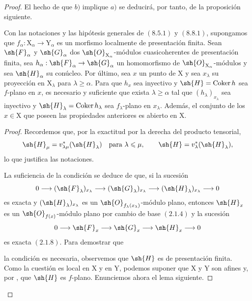 \begin{proof}
El hecho de que $b)$ implique $a)$ se deducirá, por tanto, de la proposición siguiente.

\begin{proposition}[11.3.9]
\label{IV.11.3.9}
Con las notaciones y las hipótesis generales de $(8.5.1)$ y $(8.8.1)$, supongamos que $f_\alpha:\mathrm{X}_\alpha\to\mathrm{Y}_\alpha$ es un morfismo localmente de presentación finita. Sean $\sh{F}_\alpha$ y $\sh{G}_\alpha$ dos $\sh{O}_{\mathrm{X}_\alpha}$-módulos cuasicoherentes de presentación finita, sea $h_\alpha:\sh{F}_\alpha\to\sh{G}_\alpha$ un homomorfismo de $\sh{O}_{\mathrm{X}_\alpha}$-módulos y sea $\sh{H}_\alpha$ su conúcleo. Por último, sea $x$ un punto de $\mathrm{X}$ y sea $x_\lambda$ su proyección en $\mathrm{X}_\lambda$ para $\lambda\geqslant\alpha$. Para que $h_x$ sea inyectivo y $\sh{H}=\operatorname{Coker}h$ sea $f$-plano en $x$, es necesario y suficiente que exista $\lambda\geqslant\alpha$ tal que $(h_\lambda)_{x_\lambda}$ sea inyectivo y $\sh{H}_\lambda=\operatorname{Coker}h_\lambda$ sea $f_\lambda$-plano en $x_\lambda$. Además, el conjunto de los $x\in\mathrm{X}$ que poseen las propiedades anteriores es abierto en $\mathrm{X}$.
\end{proposition}

\begin{proof}
Recordemos que, por la exactitud por la derecha del producto tensorial,
\[
  \sh{H}_\mu=v^*_{\lambda\mu}(\sh{H}_\lambda)
  \quad\text{para }\lambda\leqslant\mu,
  \qquad
  \sh{H}=v^*_\lambda(\sh{H}_\lambda),
\]
lo que justifica las notaciones.

La suficiencia de la condición se deduce de que, si la sucesión
\[
  0\longrightarrow(\sh{F}_\lambda)_{x_\lambda}
  \longrightarrow(\sh{G}_\lambda)_{x_\lambda}
  \longrightarrow(\sh{H}_\lambda)_{x_\lambda}
  \longrightarrow0
\]
es exacta y $(\sh{H}_\lambda)_{x_\lambda}$ es un $\sh{O}_{f_\lambda(x_\lambda)}$-módulo plano, entonces $\sh{H}_x$ es un $\sh{O}_{f(x)}$-módulo plano por cambio de base $(2.1.4)$ y la sucesión
\[
  0\longrightarrow\sh{F}_x
  \longrightarrow\sh{G}_x
  \longrightarrow\sh{H}_x
  \longrightarrow0
\]
es exacta $(2.1.8)$. Para demostrar que


la condición es necesaria, observemos que $\sh{H}$ es de presentación finita. Como la cuestión es local en $\mathrm{X}$ y en $\mathrm{Y}$, podemos suponer que $\mathrm{X}$ y $\mathrm{Y}$ son afines y, por , que $\sh{H}$ es $f$-plano. Enunciemos ahora el lema siguiente.


\end{proof}
\end{proof}
